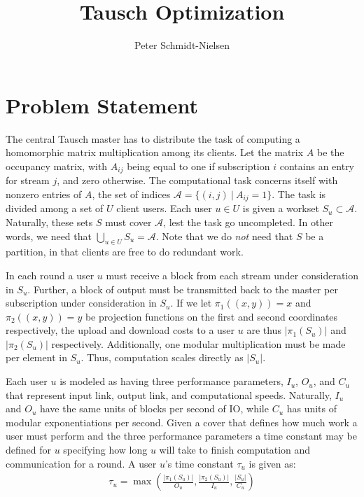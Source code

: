 \documentclass[12pt]{article}
\title{Tausch Optimization}
\author{Peter Schmidt-Nielsen}
\begin{document}
\maketitle
\section{Problem Statement}
The central Tausch master has to distribute the task of computing a homomorphic matrix multiplication among its clients.
Let the matrix $A$ be the occupancy matrix, with $A_{ij}$ being equal to one if subscription $i$ contains an entry for stream $j$, and zero otherwise.
The computational task concerns itself with nonzero entries of $A$, the set of indices $\mathcal{A} = \{ (i, j)\ |\ A_{ij} = 1 \}$.
The task is divided among a set of $U$ client users.
Each user $u \in U$ is given a workset $S_u \subset \mathcal{A}$.
Naturally, these sets $S$ must cover $\mathcal{A}$, lest the task go uncompleted.
In other words, we need that $\bigcup_{u \in U} S_u = \mathcal{A}$.
Note that we do \emph{not} need that $S$ be a partition, in that clients are free to do redundant work.

In each round a user $u$ must receive a block from each stream under consideration in $S_u$.
Further, a block of output must be transmitted back to the master per subscription under consideration in $S_u$.
If we let $\pi_1\left( (x, y) \right) = x$ and $\pi_2\left( (x, y) \right) = y$ be projection functions on the first and second coordinates respectively, the upload and download costs to a user $u$ are thus $|\pi_1(S_u)|$ and $|\pi_2(S_u)|$ respectively.
Additionally, one modular multiplication must be made per element in $S_u$.
Thus, computation scales directly as $|S_u|$.

Each user $u$ is modeled as having three performance parameters, $I_u$, $O_u$, and $C_u$ that represent input link, output link, and computational speeds.
Naturally, $I_u$ and $O_u$ have the same units of blocks per second of IO, while $C_u$ has units of modular exponentiations per second.
Given a cover that defines how much work a user must perform and the three performance parameters a time constant may be defined for $u$ specifying how long $u$ will take to finish computation and communication for a round.
A user $u$'s time constant $\tau_u$ is given as:
\begin{align}
\tau_u = \max\left( \frac{|\pi_1(S_u)|}{O_u}, \frac{|\pi_2(S_u)|}{I_u}, \frac{|S_u|}{C_u} \right)\label{localtau}
\end{align}
\end{document}

